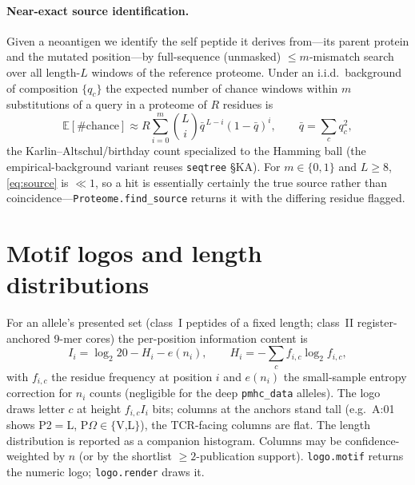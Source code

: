 \documentclass[11pt]{article}
\theoremstyle{oldplain}
\theoremstyle{oldrem}
\newcommand{\E}{\mathbb{E}}
\begin{document}
\paragraph{Near-exact source identification.} Given a neoantigen we identify the self peptide it
derives from---its parent protein and the mutated position---by full-sequence (unmasked)
$\le m$-mismatch search over all length-$L$ windows of the reference proteome. Under an
i.i.d.\ background of composition $\{q_c\}$ the expected number of chance windows within $m$
substitutions of a query in a proteome of $R$ residues is
\begin{equation}\label{eq:source}
  \E[\#\text{chance}]\approx R\sum_{i=0}^{m}\binom{L}{i}\bar q^{\,L-i}(1-\bar q)^{i},
  \qquad \bar q=\textstyle\sum_c q_c^2 ,
\end{equation}
the Karlin--Altschul/birthday count specialized to the Hamming ball (the empirical-background variant
reuses \texttt{seqtree} §KA). For $m\in\{0,1\}$ and $L\ge8$, \eqref{eq:source} is $\ll1$, so a hit is
essentially certainly the true source rather than coincidence---\texttt{Proteome.find\_source}
returns it with the differing residue flagged.

\section{Motif logos and length distributions}\label{sec:logos}
For an allele's presented set (class~I peptides of a fixed length; class~II register-anchored 9-mer
cores) the per-position information content is
\begin{equation}\label{eq:ic}
  I_i=\log_2 20-H_i-e(n_i),\qquad H_i=-\sum_{c}f_{i,c}\log_2 f_{i,c},
\end{equation}
with $f_{i,c}$ the residue frequency at position $i$ and $e(n_i)$ the small-sample entropy correction
for $n_i$ counts (negligible for the deep \texttt{pmhc\_data} alleles). The logo draws letter $c$ at
height $f_{i,c}I_i$ bits; columns at the anchors stand tall (e.g.\ A:01 shows P2$=$L,
P$\Omega\in\{$V,L$\}$), the TCR-facing columns are flat. The length distribution is reported as a
companion histogram. Columns may be confidence-weighted by $n$ (or by the shortlist
$\ge2$-publication support). \texttt{logo.motif} returns the numeric logo; \texttt{logo.render} draws
it.
\end{document}
